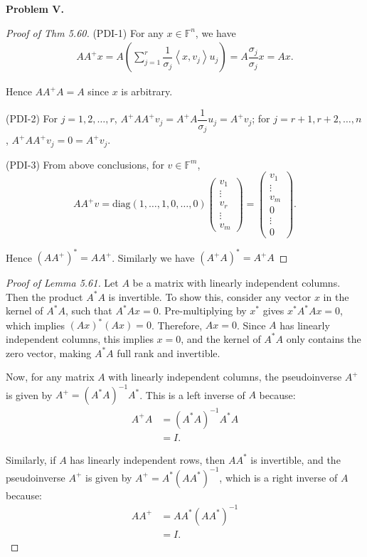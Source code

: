 \documentclass[UTF8]{ctexart}
\newcommand{\avg}[1]{\left\langle #1 \right\rangle}
\begin{document}
\textbf{Problem V.}

\begin{proof}[Proof of Thm 5.60]
	(PDI-1) For any $x\in\mathbb{F}^n$, we have
	\[\begin{aligned}
			AA^{+}x=A\left(\sum_{j=1}^r\dfrac{1}{\sigma_j}\avg{x,v_j}u_j\right)=A\dfrac{\sigma_j}{\sigma_j}x=Ax.
		\end{aligned}\]

	Hence $AA^{+}A=A$ since $x$ is arbitrary.

	(PDI-2) For $j=1,2,\dots,r$, $A^{+}AA^{+}v_j=A^{+}A\dfrac{1}{\sigma_j}u_j=A^{+}v_j$; for $j=r+1,r+2,\dots, n$, $A^+AA^+v_j=0=A^+v_j$.

	(PDI-3) From above conclusions, for $v\in\mathbb{F}^m$,
	\[AA^+v=\mathrm{diag}(1,\dots,1,0,\dots,0)\begin{pmatrix}
			v_1 \\\vdots\\v_r\\\vdots\\v_m
		\end{pmatrix}=\begin{pmatrix}
			v_1 \\\vdots\\v_m\\0\\\vdots\\0
		\end{pmatrix}.\]

	Hence $(AA^+)^*=AA^+$. Similarly we have $(A^+A)^*=A^+A$
\end{proof}

\begin{proof}[Proof of Lemma 5.61]
	Let \( A \) be a matrix with linearly independent columns. Then the product \( A^*A \) is invertible. To show this, consider any vector \( x \) in the kernel of \( A^*A \), such that \( A^*Ax = 0 \). Pre-multiplying by \( x^* \) gives \( x^*A^*Ax = 0 \), which implies \( (Ax)^*(Ax) = 0 \). Therefore, \( Ax = 0 \). Since \( A \) has linearly independent columns, this implies \( x = 0 \), and the kernel of \( A^*A \) only contains the zero vector, making \( A^*A \) full rank and invertible.

	Now, for any matrix \( A \) with linearly independent columns, the pseudoinverse \( A^+ \) is given by \( A^+ = (A^*A)^{-1}A^* \). This is a left inverse of \( A \) because:
	\begin{align*}
		A^+A & = (A^*A)^{-1}A^*A \\
		     & = I.
	\end{align*}

	Similarly, if \( A \) has linearly independent rows, then \( AA^* \) is invertible, and the pseudoinverse \( A^+ \) is given by \( A^+ = A^*(AA^*)^{-1} \), which is a right inverse of \( A \) because:
	\begin{align*}
		AA^+ & = AA^*(AA^*)^{-1} \\
		     & = I.
	\end{align*}
\end{proof}
\end{document}
